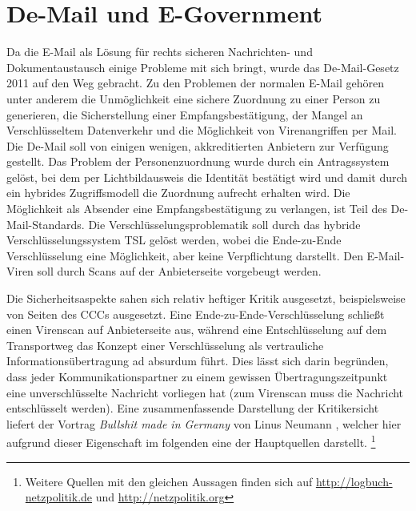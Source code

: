 \documentclass[
	12pt,
	a4paper,
	BCOR10mm,
	DIV14,
	listof=totoc,
	bibliography=totoc,
	headsepline
]{scrreprt}
\begin{document}

\section{De-Mail und E-Government}
\label{demail}
Da die E-Mail als Lösung für rechts sicheren Nachrichten- und Dokumentaustausch einige Probleme mit sich bringt, wurde das De-Mail-Gesetz 2011 auf den Weg gebracht.
Zu den Problemen der normalen E-Mail gehören unter anderem die Unmöglichkeit eine sichere Zuordnung zu einer Person zu generieren, die Sicherstellung einer Empfangsbestätigung, der Mangel an Verschlüsseltem Datenverkehr und die Möglichkeit von Virenangriffen per Mail.
Die De-Mail soll von einigen wenigen, akkreditierten Anbietern zur Verfügung gestellt.
Das Problem der Personenzuordnung wurde durch ein Antragssystem gelöst, bei dem per Lichtbildausweis die Identität bestätigt wird und damit durch ein hybrides Zugriffsmodell die Zuordnung aufrecht erhalten wird.
Die Möglichkeit als Absender eine Empfangsbestätigung zu verlangen, ist Teil des De-Mail-Standards.
Die Verschlüsselungsproblematik soll durch das hybride Verschlüsselungssystem TSL gelöst werden, wobei die Ende-zu-Ende Verschlüsselung eine Möglichkeit, aber keine Verpflichtung darstellt.
Den E-Mail-Viren soll durch Scans auf der Anbieterseite vorgebeugt werden.

Die Sicherheitsaspekte sahen sich relativ heftiger Kritik ausgesetzt, beispielsweise von Seiten des CCCs ausgesetzt.
Eine Ende-zu-Ende-Verschlüsselung schließt einen Virenscan auf Anbieterseite aus, während eine Entschlüsselung auf dem Transportweg das Konzept einer Verschlüsselung als vertrauliche Informationsübertragung ad absurdum führt.
Dies lässt sich darin begründen, dass jeder Kommunikationspartner zu einem gewissen Übertragungszeitpunkt eine unverschlüsselte Nachricht vorliegen hat (zum Virenscan muss die Nachricht entschlüsselt werden).
Eine zusammenfassende Darstellung der Kritikersicht liefert der Vortrag \textit{Bullshit made in Germany} von Linus Neumann \cite{bsinger}, welcher hier aufgrund dieser Eigenschaft im folgenden eine der Hauptquellen darstellt. \footnote{Weitere Quellen mit den gleichen Aussagen finden sich auf \url{http://logbuch-netzpolitik.de} und \url{http://netzpolitik.org}}
\end{document}
